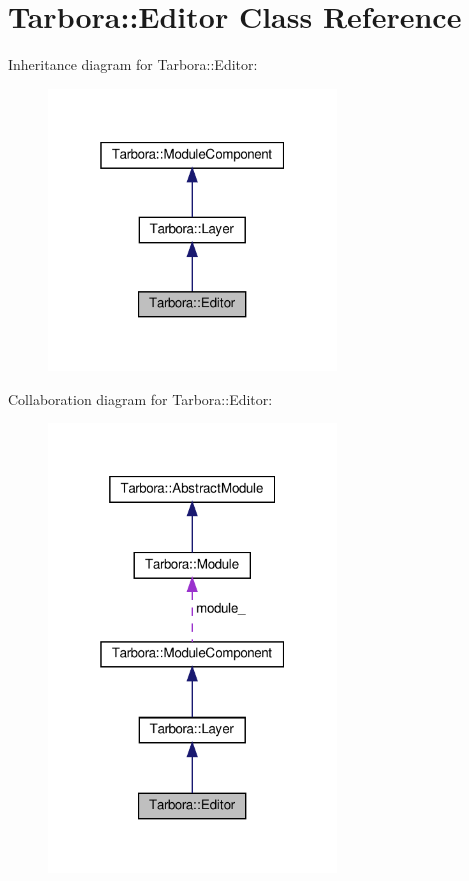 \hypertarget{classTarbora_1_1Editor}{}\section{Tarbora\+:\+:Editor Class Reference}
\label{classTarbora_1_1Editor}


Inheritance diagram for Tarbora\+:\+:Editor\+:
\nopagebreak
\begin{figure}[H]
\begin{center}
\leavevmode
\includegraphics[width=217pt]{classTarbora_1_1Editor__inherit__graph}
\end{center}
\end{figure}


Collaboration diagram for Tarbora\+:\+:Editor\+:
\nopagebreak
\begin{figure}[H]
\begin{center}
\leavevmode
\includegraphics[width=217pt]{classTarbora_1_1Editor__coll__graph}
\end{center}
\end{figure}
